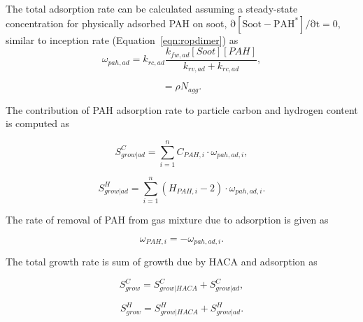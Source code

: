 The total adsorption rate can be calculated assuming a steady-state concentration for physically adsorbed PAH on soot, $\mathrm{\partial{[{Soot-PAH^*}]}/\partial t = 0}$, similar to inception rate (Equation~\eqref{eqn:ropdimer}) as\\

\begin{equation}
	\omega_{pah,ad} = k_{rc,ad}\frac{k_{fw,ad}[Soot][PAH]}{k_{rv,ad}+k_{rc,ad}}
	\label{eqn:road},
\end{equation}

\begin{equation}
	[Soot] = \rho N_{agg}
	\label{eqn:sootconcen}.
\end{equation}


The contribution of PAH adsorption rate to particle carbon and hydrogen content is computed as

\begin{equation}
	S^C_{grow|ad} =
	\sum_{i=1}^{n} 
	C_{PAH,i}\cdot\omega_{pah,ad,i}
	\label{eqn:SCad},
\end{equation}

\begin{equation}
	S^H_{grow|ad} =
	\sum_{i=1}^{n} 
	(H_{PAH,i}-2)\cdot\omega_{pah,ad,i}
	\label{eqn:SHad}.
\end{equation}

The rate of removal of PAH from gas mixture due to adsorption is given as

\begin{equation}
	\omega_{PAH,i} =
	-\omega_{pah,ad,i}
	\label{eqn:pahscrubingad}.
\end{equation}

The total growth rate is sum of growth due by HACA and adsorption as

\begin{equation}
	S^C_{grow} =
	S^C_{grow|HACA} + S^C_{grow|ad}
	\label{eqn:SCgrow},
\end{equation}

\begin{equation}
	S^H_{grow} =
	S^H_{grow|HACA} + S^H_{grow|ad}
	\label{eqn:SHgrow}.
\end{equation}


